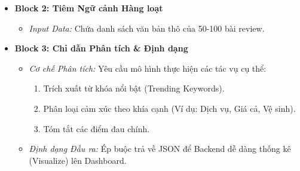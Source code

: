 \begin{itemize}
\begin{itemize}
        \item \textbf{Block 2: Tiêm Ngữ cảnh Hàng loạt}
        \begin{itemize}
            \item \textit{Input Data:} Chứa danh sách văn bản thô của 50-100 bài review.
        \end{itemize}
        
        \item \textbf{Block 3: Chỉ dẫn Phân tích \& Định dạng}
        \begin{itemize}
            \item \textit{Cơ chế Phân tích:} Yêu cầu mô hình thực hiện các tác vụ cụ thể:
            \begin{enumerate}[label=\arabic*., leftmargin=*]
                \item Trích xuất từ khóa nổi bật (Trending Keywords).
                \item Phân loại cảm xúc theo khía cạnh (Ví dụ: Dịch vụ, Giá cả, Vệ sinh).
                \item Tóm tắt các điểm đau chính.
            \end{enumerate}
            \item \textit{Định dạng Đầu ra:} Ép buộc trả về JSON để Backend dễ dàng thống kê (Visualize) lên Dashboard.
        \end{itemize}
    \end{itemize}
\end{itemize}


